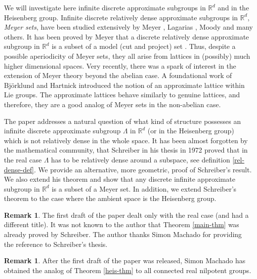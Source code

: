 \documentclass[10pt]{amsart}
\newcommand{\bR}{\mathbb{R}}
\newcounter{dummy} \numberwithin{dummy}{section}
\theoremstyle{plain}
\theoremstyle{definition}
\newtheorem{remark}[dummy]{Remark}
\begin{document}
We will investigate here infinite discrete approximate subgroups in $\bR^d$ and in the Heisenberg group.
Infinite discrete relatively dense approximate subgroups in $\bR^d$, \textit{Meyer sets}, have been studied extensively by Meyer \cite{Me}, Lagarias \cite{La}, Moody \cite{Mo} and many others.
It has been proved by Meyer \cite{Me} that a discrete relatively dense approximate subgroup in $\bR^d$ is a subset of a model (cut and project) set \cite{Mo}.
Thus, despite a possible aperiodicity of Meyer sets, they all arise from lattices in (possibly) much higher dimensional spaces. Very recently, there was a spark of interest in the extension of Meyer theory beyond the abelian case. A foundational work of Björklund and Hartnick \cite{BH} introduced the notion of an approximate lattice within Lie groups. The approximate lattices behave similarly to genuine lattices, and therefore, they are a good analog of Meyer sets in the non-abelian case.

The paper addresses a natural question of what kind of structure possesses an infinite discrete approximate subgroup $\Lambda$ in $\bR^d$ (or in the Heisenberg group) which is not relatively dense in the whole space. It has been almost forgotten by the mathematical community, that Schreiber in his thesis in 1972 \cite{S} proved that
in the real case $\Lambda$ has to be relatively dense around a subspace, see definition \ref{rel-dense-def}. We provide an alternative, more geometric, proof of Schreiber's result. We also extend his theorem and show that any discrete infinite approximate subgroup in $\bR^d$ is a subset of a Meyer set. In addition, we extend Schreiber's theorem to the case where the ambient space is the Heisenberg group.

\begin{remark}
The first draft of the paper dealt only with the real case (and had a different title). It was not known to the author that Theorem \ref{main-thm} was already proved by Schreiber. The author thanks Simon Machado for providing the reference to Schreiber's thesis.
\end{remark}

\begin{remark} After the first draft of the paper was released, Simon Machado has obtained the analog of Theorem \ref{heis-thm} to all connected real nilpotent groups.
\end{remark}
\end{document}
